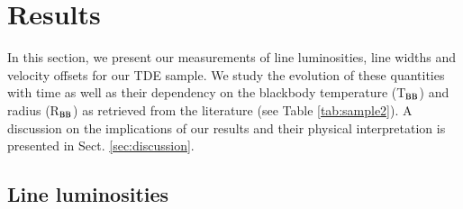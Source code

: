 \documentclass[structabstract]{aa}
\begin{document}
\section{Results} \label{sec:results}
In this section, we present our measurements of line luminosities, line widths and velocity offsets for our TDE sample. We study the evolution of these quantities with time as well as their dependency on the blackbody temperature (T$_{\rm BB}$) and radius (R$_{\rm BB}$) as retrieved from the literature (see Table \ref{tab:sample2}). A discussion on the implications of our results and their physical interpretation is presented in Sect. \ref{sec:discussion}.

\subsection{Line luminosities} \label{sub:ll}
\end{document}
